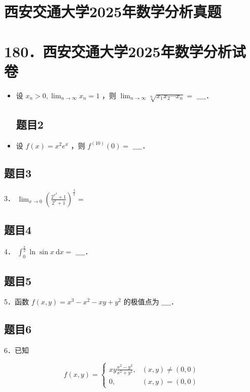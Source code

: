 \documentclass{article}
\begin{document}
\section*{西安交通大学2025年数学分析真题}
\section*{180．西安交通大学2025年数学分析试卷}
\begin{itemize}

\subsection{题目1}
  \item[1．] 设 \(x_{n}>0, \lim _{n \rightarrow \infty} x_{n}=1\) ，则 \(\lim _{n \rightarrow \infty} \sqrt[n]{x_{1} x_{2} \cdots x_{n}}=\) \(\_\_\_\_\)．

\subsection{题目2}
  \item[2．] 设 \(f(x)=x^{2} e^{x}\) ，则 \(f^{(10)}(0)=\) \(\_\_\_\_\)．
\end{itemize}

\subsection{题目3}
3． \(\lim _{x \rightarrow 0}\left(\frac{2^{x^{2}}+1}{2^{x}+1}\right)^{\frac{1}{x}}=\)

\subsection{题目4}
4． \(\int_{0}^{\frac{\pi}{2}} \ln \sin x \mathrm{~d} x=\) \(\_\_\_\_\)．

\subsection{题目5}
5．函数 \(f(x, y)=x^{3}-x^{2}-x y+y^{2}\) 的极值点为 \(\_\_\_\_\)．

\subsection{题目6}
6．已知

\[
f(x, y)= \begin{cases}x y \frac{x^{2}-y^{2}}{x^{2}+y^{2}}, & (x, y) \neq(0,0) \\ 0, & (x, y)=(0,0)\end{cases}
\]
\end{document}
